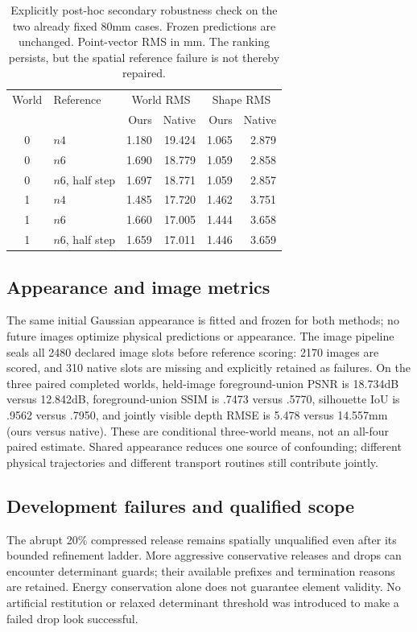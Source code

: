 \documentclass[10pt,twocolumn,letterpaper]{article}
\begin{document}
\begin{table}[t]
\centering\small
\begin{tabular}{clrrrr}
\toprule
World& Reference &\multicolumn{2}{c}{World RMS}&\multicolumn{2}{c}{Shape RMS}\\
&&Ours&Native&Ours&Native\\
\midrule
0&$n4$&1.180&19.424&1.065&2.879\\
0&$n6$&1.690&18.779&1.059&2.858\\
0&$n6$, half step&1.697&18.771&1.059&2.857\\
1&$n4$&1.485&17.720&1.462&3.751\\
1&$n6$&1.660&17.005&1.444&3.658\\
1&$n6$, half step&1.659&17.011&1.446&3.659\\
\bottomrule
\end{tabular}
\caption{Explicitly post-hoc secondary robustness check on the two already fixed 80mm cases. Frozen predictions are unchanged. Point-vector RMS in mm. The ranking persists, but the spatial reference failure is not thereby repaired.}
\end{table}

\subsection{Appearance and image metrics}
The same initial Gaussian appearance is fitted and frozen for both methods; no future images optimize physical predictions or appearance. The image pipeline seals all 2480 declared image slots before reference scoring: 2170 images are scored, and 310 native slots are missing and explicitly retained as failures. On the three paired completed worlds, held-image foreground-union PSNR is 18.734dB versus 12.842dB, foreground-union SSIM is .7473 versus .5770, silhouette IoU is .9562 versus .7950, and jointly visible depth RMSE is 5.478 versus 14.557mm (ours versus native). These are conditional three-world means, not an all-four paired estimate. Shared appearance reduces one source of confounding; different physical trajectories and different transport routines still contribute jointly.

\subsection{Development failures and qualified scope}
The abrupt 20\% compressed release remains spatially unqualified even after its bounded refinement ladder. More aggressive conservative releases and drops can encounter determinant guards; their available prefixes and termination reasons are retained. Energy conservation alone does not guarantee element validity. No artificial restitution or relaxed determinant threshold was introduced to make a failed drop look successful.
\end{document}
